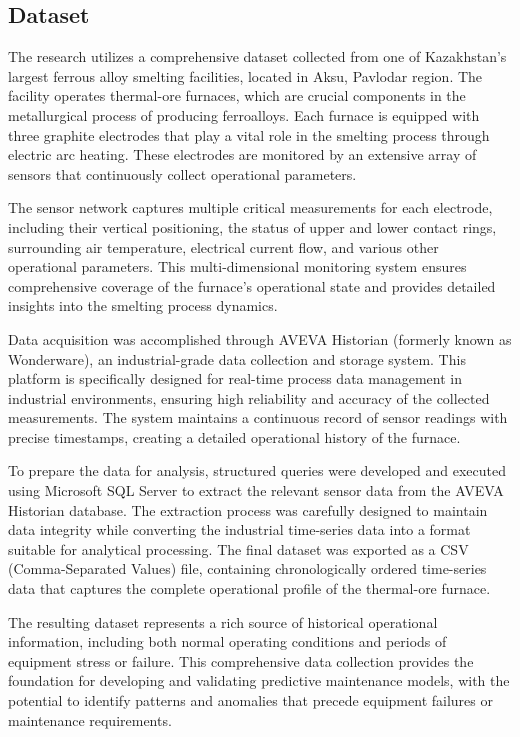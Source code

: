\subsection{Dataset}

The research utilizes a comprehensive dataset collected from one of Kazakhstan's largest ferrous alloy smelting facilities, located in Aksu, Pavlodar region. The facility operates thermal-ore furnaces, which are crucial components in the metallurgical process of producing ferroalloys. Each furnace is equipped with three graphite electrodes that play a vital role in the smelting process through electric arc heating. These electrodes are monitored by an extensive array of sensors that continuously collect operational parameters.

The sensor network captures multiple critical measurements for each electrode, including their vertical positioning, the status of upper and lower contact rings, surrounding air temperature, electrical current flow, and various other operational parameters. This multi-dimensional monitoring system ensures comprehensive coverage of the furnace's operational state and provides detailed insights into the smelting process dynamics.

Data acquisition was accomplished through AVEVA Historian (formerly known as Wonderware), an industrial-grade data collection and storage system. This platform is specifically designed for real-time process data management in industrial environments, ensuring high reliability and accuracy of the collected measurements. The system maintains a continuous record of sensor readings with precise timestamps, creating a detailed operational history of the furnace.

To prepare the data for analysis, structured queries were developed and executed using Microsoft SQL Server to extract the relevant sensor data from the AVEVA Historian database. The extraction process was carefully designed to maintain data integrity while converting the industrial time-series data into a format suitable for analytical processing. The final dataset was exported as a CSV (Comma-Separated Values) file, containing chronologically ordered time-series data that captures the complete operational profile of the thermal-ore furnace.

The resulting dataset represents a rich source of historical operational information, including both normal operating conditions and periods of equipment stress or failure. This comprehensive data collection provides the foundation for developing and validating predictive maintenance models, with the potential to identify patterns and anomalies that precede equipment failures or maintenance requirements.

